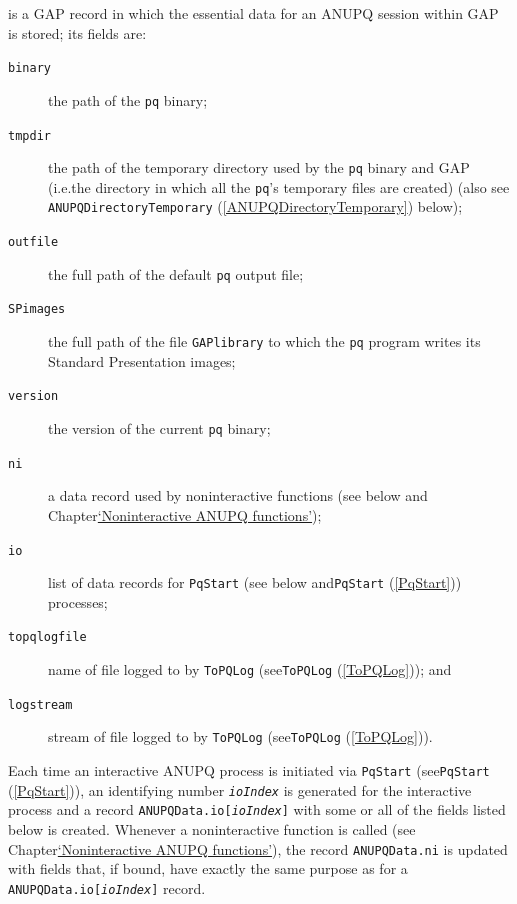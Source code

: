 \documentclass[a4paper,11pt]{report}
\begin{document}
{{{ is a \textsf{GAP} record in which the essential data for an \textsf{ANUPQ} session within \textsf{GAP} is stored; its fields are: 
\begin{description}
\item[{\texttt{binary}}]  the path of the \texttt{pq} binary; 
\item[{\texttt{tmpdir}}]  the path of the temporary directory used by the \texttt{pq} binary and \textsf{GAP} (i.e.{\nobreakspace}the directory in which all the \texttt{pq}'s temporary files are created) (also see \texttt{ANUPQDirectoryTemporary} (\ref{ANUPQDirectoryTemporary}) below); 
\item[{\texttt{outfile}}]  the full path of the default \texttt{pq} output file; 
\item[{\texttt{SPimages}}]  the full path of the file \texttt{GAP{\textunderscore}library} to which the \texttt{pq} program writes its Standard Presentation images; 
\item[{\texttt{version}}]  the version of the current \texttt{pq} binary; 
\item[{\texttt{ni}}]  a data record used by non\texttt{}interactive functions (see below
and Chapter{\nobreakspace}\hyperref[non-interact]{`Non\texttt{}interactive ANUPQ functions'}); 
\item[{\texttt{io}}]  list of data records for \texttt{PqStart} (see below and{\nobreakspace}\texttt{PqStart} (\ref{PqStart})) processes; 
\item[{\texttt{topqlogfile}}]  name of file logged to by \texttt{ToPQLog} (see{\nobreakspace}\texttt{ToPQLog} (\ref{ToPQLog})); and 
\item[{\texttt{logstream}}]  stream of file logged to by \texttt{ToPQLog} (see{\nobreakspace}\texttt{ToPQLog} (\ref{ToPQLog})). 
\end{description}
 Each time an interactive \textsf{ANUPQ} process is initiated via \texttt{PqStart} (see{\nobreakspace}\texttt{PqStart} (\ref{PqStart})), an identifying number \mbox{\texttt{\mdseries\slshape ioIndex}} is generated for the interactive process and a record \texttt{ANUPQData.io[\mbox{\texttt{\mdseries\slshape ioIndex}}]} with some or all of the fields listed below is created. Whenever a
non\texttt{}interactive function is called (see
Chapter{\nobreakspace}\hyperref[non-interact]{`Non\texttt{}interactive ANUPQ functions'}), the record \texttt{ANUPQData.ni} is updated with fields that, if bound, have exactly the same purpose as for a \texttt{ANUPQData.io[\mbox{\texttt{\mdseries\slshape ioIndex}}]} record. 
}}}
\end{document}
